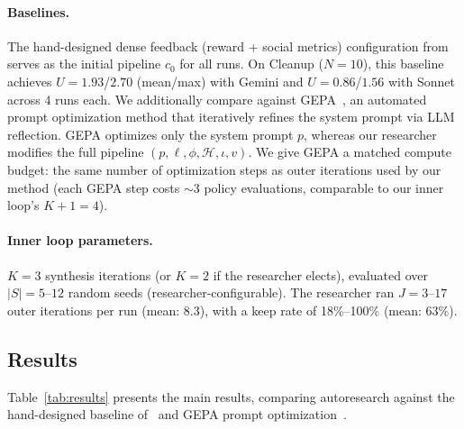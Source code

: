 \documentclass[sigconf,authordraft]{acmart}
\begin{document}
\paragraph{Baselines.}
The hand-designed dense feedback (reward + social metrics) configuration from~\cite{gallego2026} serves as the initial pipeline $c_0$ for all runs. On Cleanup ($N{=}10$), this baseline achieves $U{=}1.93$/$2.70$ (mean/max) with Gemini and $U{=}0.86$/$1.56$ with Sonnet across 4 runs each. We additionally compare against GEPA~\cite{agrawal2026}, an automated prompt optimization method that iteratively refines the system prompt via LLM reflection. GEPA optimizes only the system prompt $p$, whereas our researcher modifies the full pipeline $(p, \ell, \phi, \mathcal{H}, \iota, v)$. We give GEPA a matched compute budget: the same number of optimization steps as outer iterations used by our method (each GEPA step costs ${\sim}3$ policy evaluations, comparable to our inner loop's $K{+}1{=}4$).

\paragraph{Inner loop parameters.}
$K{=}3$ synthesis iterations (or $K{=}2$ if the researcher elects), evaluated over $|S|{=}5$--$12$ random seeds (researcher-configurable). The researcher ran $J{=}3$--$17$ outer iterations per run (mean: 8.3), with a keep rate of 18\%--100\% (mean: 63\%).

\subsection{Results}

Table~\ref{tab:results} presents the main results, comparing autoresearch against the hand-designed baseline of~\cite{gallego2026} and GEPA prompt optimization~\cite{agrawal2026}.
\end{document}
